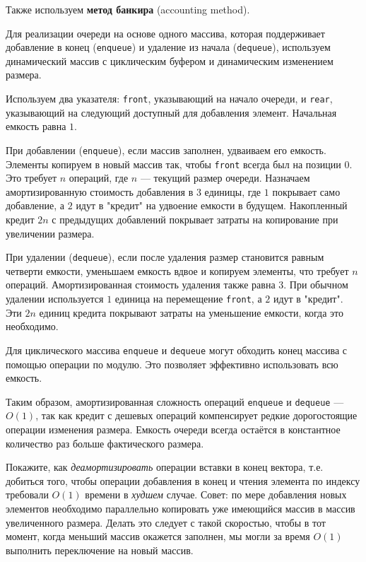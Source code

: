 \documentclass[11pt]{article}
\begin{document}
\begin{solution}
	Также используем \textbf{метод банкира} (accounting method).

	Для реализации очереди на основе одного массива, которая поддерживает добавление в конец (\texttt{enqueue}) и удаление из начала (\texttt{dequeue}), используем динамический массив с циклическим буфером и динамическим изменением размера.

	Используем два указателя: \texttt{front}, указывающий на начало очереди, и \texttt{rear}, указывающий на следующий доступный для добавления элемент. Начальная емкость равна \(1\).

	При добавлении (\texttt{enqueue}), если массив заполнен, удваиваем его емкость. Элементы копируем в новый массив так, чтобы \texttt{front} всегда был на позиции \(0\). Это требует \(n\) операций, где \(n\) — текущий размер очереди. Назначаем амортизированную стоимость добавления в \(3\) единицы, где \(1\) покрывает само добавление, а \(2\) идут в "кредит" на удвоение емкости в будущем. Накопленный кредит \(2n\) с предыдущих добавлений покрывает затраты на копирование при увеличении размера.

	При удалении (\texttt{dequeue}), если после удаления размер становится равным четверти емкости, уменьшаем емкость вдвое и копируем элементы, что требует \(n\) операций. Амортизированная стоимость удаления также равна \(3\). При обычном удалении используется \(1\) единица на перемещение \texttt{front}, а \(2\) идут в "кредит". Эти \(2n\) единиц кредита покрывают затраты на уменьшение емкости, когда это необходимо.

	Для циклического массива \texttt{enqueue} и \texttt{dequeue} могут обходить конец массива с помощью операции по модулю. Это позволяет эффективно использовать всю емкость.

	Таким образом, амортизированная сложность операций \texttt{enqueue} и \texttt{dequeue} — \(O(1)\), так как кредит с дешевых операций компенсирует редкие дорогостоящие операции изменения размера. Емкость очереди всегда остаётся в константное количество раз больше фактического размера.

\end{solution}

\begin{problem}{30}
Покажите, как \emph{деамортизировать} операции вставки в конец вектора, т.е. добиться того, чтобы операции добавления в конец и чтения элемента по индексу требовали $O(1)$ времени в \emph{худшем} случае. Совет: по мере добавления новых элементов необходимо параллельно копировать уже имеющийся массив в массив увеличенного размера. Делать это следует с такой скоростью, чтобы в тот момент, когда меньший массив окажется заполнен, мы могли за время $O(1)$ выполнить переключение на новый массив.
\end{problem}
\end{document}
